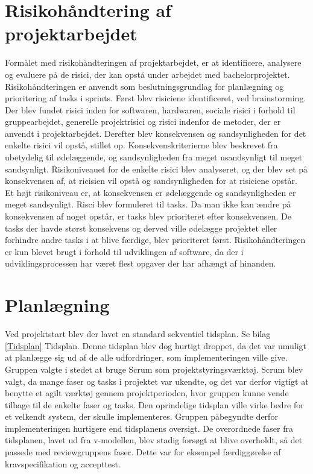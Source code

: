 \section{Risikohåndtering af projektarbejdet}
Formålet med risikohåndteringen af projektarbejdet, er at identificere, analysere og evaluere på de risici, der kan opstå under arbejdet med bachelorprojektet. Risikohåndteringen er anvendt som beslutningsgrundlag for planlægning og prioritering af tasks i sprints. Først blev risiciene identificeret, ved brainstorming. Der blev fundet risici inden for softwaren, hardwaren, sociale risici i forhold til gruppearbejdet, generelle projektrisici og risici indenfor de metoder, der er anvendt i projektarbejdet. Derefter blev konsekvensen og sandsynligheden for det enkelte risici vil opstå, stillet op. Konsekvenskriterierne blev beskrevet fra ubetydelig til ødelæggende, og sandsynligheden fra meget usandsynligt til meget sandsynligt. Risikoniveauet for de enkelte risici blev analyseret, og der blev set på konsekvensen af, at ricisien vil opstå og sandsynligheden for at risiciene opstår. Et højt risikoniveau er, at konsekvensen er ødelæggende og sandsynligheden er meget sandsynligt. Risci blev formuleret til tasks. Da man ikke kan ændre på konsekvensen af noget opstår, er tasks blev prioriteret efter konsekvensen. De tasks der havde størst konsekvens og derved ville ødelægge projektet eller forhindre andre tasks i at blive færdige, blev prioriteret først. Risikohåndteringen er kun blevet brugt i forhold til udviklingen af software, da der i udviklingsprocessen har været flest opgaver der har afhængt af hinanden.

\section{Planlægning}
Ved projektstart blev der lavet en standard sekventiel tidsplan. Se bilag \ref{Tidsplan} Tidsplan. Denne tidsplan blev dog hurtigt droppet, da det var umuligt at planlægge sig ud af de alle udfordringer, som implementeringen ville give. Gruppen valgte i stedet at bruge Scrum som projektstyringsværktøj. Scrum blev valgt, da mange faser og tasks i projektet var ukendte, og det var derfor vigtigt at benytte et agilt værktøj gennem projektperioden, hvor gruppen kunne vende tilbage til de enkelte faser og tasks. Den oprindelige tidsplan ville virke bedre for et velkendt system, der skulle implementeres. Gruppen påbegyndte derfor implementeringen hurtigere end tidsplanens oversigt. De overordnede faser fra tidsplanen, lavet ud fra v-modellen, blev stadig forsøgt at blive overholdt, så det passede med reviewgruppens faser. Dette var for eksempel færdiggørelse af kravspecifikation og accepttest. 

